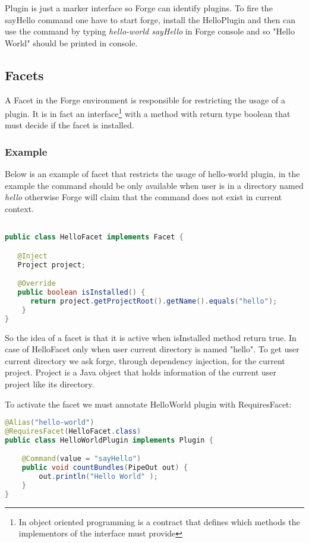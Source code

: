 Plugin is just a marker interface so Forge can identify plugins. To fire the sayHello command one have to start forge, install the HelloPlugin and then can use the command by typing \emph{hello-world sayHello} in Forge console and so "Hello World" should be printed in console.

\subsection{Facets}
\label{sec:forge:facet}
A Facet in the Forge environment is responsible for restricting the usage of a plugin. It is in fact an interface\footnote{In object oriented programming is a contract that defines which methods the implementors of the interface must provide} with a method with return type boolean that must decide if the facet is installed.

\subsubsection{Example}
Below is an example of facet that restricts the usage of hello-world plugin, in the example the command should be only available when user is in a directory named \emph{hello} otherwise Forge will claim that the command does not exist in current context.

\begin{lstlisting}[language=java,label=hello-facet,caption=Forge facet example]

public class HelloFacet implements Facet {

   @Inject 
   Project project;

   @Override
   public boolean isInstalled() {
      return project.getProjectRoot().getName().equals("hello");
    }
}
\end{lstlisting}

So the idea of a facet is that it is active when isInstalled method return true. In case of HelloFacet only when user current directory is
named "hello". To get user current directory we ask forge, through dependency injection, for the current project. Project is a Java object that holds information of the current user project like its directory. 

To activate the facet we must annotate HelloWorld plugin with RequiresFacet:

\begin{lstlisting}[language=java,label=forge-plugin-facet,caption=Forge plugin with facet example]
@Alias("hello-world")
@RequiresFacet(HelloFacet.class)
public class HelloWorldPlugin implements Plugin {

    @Command(value = "sayHello")
    public void countBundles(PipeOut out) {
        out.println("Hello World" );
    }
}
\end{lstlisting}

